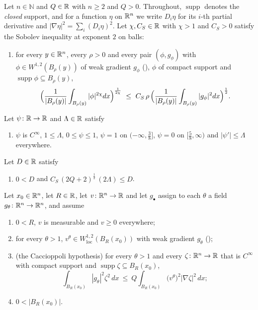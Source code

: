 \begin{helper}
Let $n\in\mathbb{N}$ and $Q\in\mathbb{R}$ with $n\ge2$ and $Q>0$.  Throughout,
$\operatorname{supp}$ denotes the \emph{closed} support, and for a function
$\eta$ on $\mathbb{R}^n$ we write $D_i\eta$ for its $i$-th partial derivative and
$|\nabla\eta|^2=\sum_i(D_i\eta)^2$.  Let $\chi,C_S\in\mathbb{R}$ with $\chi>1$ and
$C_S>0$ satisfy the Sobolev inequality at exponent $2$ on balls:
\begin{enumerate}
\item[(H1)] for every $y\in\mathbb{R}^n$, every $\rho>0$ and every pair
  $(\phi,g_\phi)$ with $\phi\in W^{1,2}(B_\rho(y))$ of weak gradient $g_\phi$
  (), $\phi$ of compact support and
  $\operatorname{supp}\phi\subseteq B_\rho(y)$,
  \[
  \Bigl(\frac1{|B_\rho(y)|}\int_{B_\rho(y)}|\phi|^{2\chi}dx\Bigr)^{\frac1{2\chi}}
  \ \le\ C_S\,\rho\,
  \Bigl(\frac1{|B_\rho(y)|}\int_{B_\rho(y)}|g_\phi|^2dx\Bigr)^{\frac12}.
  \]
\end{enumerate}
Let $\psi\colon\mathbb{R}\to\mathbb{R}$ and $\Lambda\in\mathbb{R}$ satisfy
\begin{enumerate}
\item[(H2)] $\psi$ is $C^\infty$, $1\le\Lambda$, $0\le\psi\le1$, $\psi=1$ on
  $(-\infty,\tfrac38]$, $\psi=0$ on $[\tfrac58,\infty)$ and
  $|\psi'|\le\Lambda$ everywhere.
\end{enumerate}
Let $D\in\mathbb{R}$ satisfy
\begin{enumerate}
\item[(H3)] $0<D$ and
  $C_S\,(2Q+2)^{\frac12}\,(2\Lambda)\le D$.
\end{enumerate}
Let $x_0\in\mathbb{R}^n$, let $R\in\mathbb{R}$, let $v\colon\mathbb{R}^n\to\mathbb{R}$ and let $g_\bullet$
assign to each $\theta$ a field $g_\theta\colon\mathbb{R}^n\to\mathbb{R}^n$, and assume
\begin{enumerate}
\item[(H4)] $0<R$, $v$ is measurable and $v\ge0$ everywhere;
\item[(H5)] for every $\theta>1$, $v^\theta\in W^{1,2}_{\mathrm{loc}}(B_R(x_0))$
  with weak gradient $g_\theta$ ();
\item[(H6)] (the Caccioppoli hypothesis) for every $\theta>1$ and every
  $\zeta\colon\mathbb{R}^n\to\mathbb{R}$ that is $C^\infty$ with compact support and
  $\operatorname{supp}\zeta\subseteq B_R(x_0)$,
  \[
  \int_{B_R(x_0)}|g_\theta|^2\zeta^2\,dx
  \ \le\ Q\int_{B_R(x_0)}\bigl(v^\theta\bigr)^2|\nabla\zeta|^2\,dx ;
  \]
\item[(H7)] $0<|B_R(x_0)|$.
\end{enumerate}

\end{helper}
